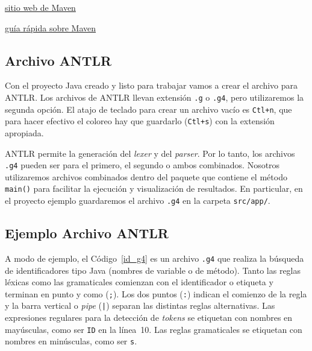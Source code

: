\documentclass[a5paper,10pt]{article}
\begin{document}
\href{https://maven.apache.org/}{sitio web de Maven}

\href{https://maven.apache.org/guides/getting-started/maven-in-five-minutes.html}{guía rápida sobre Maven}


\subsection{Archivo ANTLR}
\label{archivo_antlr}

Con el proyecto Java creado y listo para trabajar vamos a crear el archivo para ANTLR. Los archivos de ANTLR llevan extensión \verb|.g| o \verb|.g4|, pero utilizaremos la segunda opción.  El atajo de teclado para crear un archivo vacío es \verb|Ctl+n|, que para hacer efectivo el coloreo hay que guardarlo (\verb|Ctl+s|) con la extensión apropiada.

ANTLR permite la generación del \emph{lexer} y del \emph{parser}.  Por lo tanto, los archivos \verb|.g4| pueden ser para el primero, el segundo o ambos combinados.  Nosotros utilizaremos archivos combinados dentro del paquete que contiene el método \verb|main()| para facilitar la ejecución y visualización de resultados.  En particular, en el proyecto ejemplo guardaremos el archivo \verb|.g4| en la carpeta \verb|src/app/|.


\subsection{Ejemplo Archivo ANTLR}
\label{ejemplo_archivo_antlr}



A modo de ejemplo, el Código~\ref{id_g4} es un archivo \verb|.g4| que realiza la búsqueda de identificadores tipo Java (nombres de variable o de método).  Tanto las reglas léxicas como las gramaticales comienzan con el identificador o etiqueta y terminan en punto y como (\verb|;|).  Los dos puntos (\verb|:|) indican el comienzo de la regla y la barra vertical o \emph{pipe} (\verb-|-) separan las distintas reglas alternativas.  Las expresiones regulares para la detección de \emph{tokens} se etiquetan con nombres en mayúsculas, como ser \verb|ID| en la línea~10.  Las reglas gramaticales se etiquetan con nombres en minúsculas, como ser \verb|s|.
\end{document}

